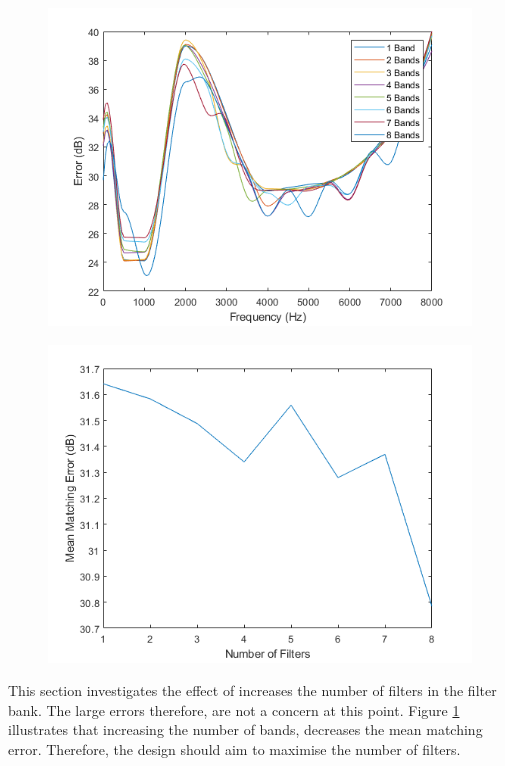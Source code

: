 \documentclass[12pt, onecolumn]{article}
\begin{document}
\begin{figure}
\centering
\begin{minipage}{.45\linewidth}
  \centering
  \includegraphics[width=0.9\linewidth]{numBandsErrorFreq.png}
  \label{fig:numBandsErrorFreq}
\end{minipage}%
\begin{minipage}{.45\linewidth}
  \centering
  \includegraphics[width=0.9\linewidth]{numBandErrorBand.png}
  \label{fig:numBandsErrorBand}
\end{minipage}
\end{figure}

\noindent This section investigates the effect of increases the number of filters in the filter bank. The large errors therefore, are not a concern at this point. Figure \ref{fig:numBandsErrorBand} illustrates that increasing the number of bands, decreases the mean matching error. Therefore, the design should aim to maximise the number of filters.
\end{document}
